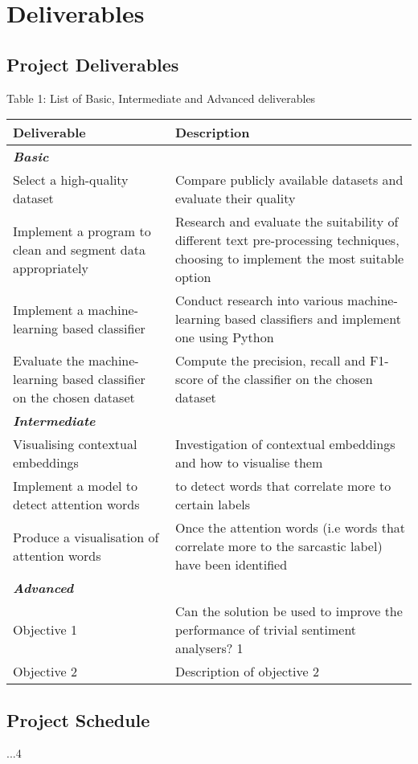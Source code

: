 \documentclass[12pt,a4paper]{article}
\begin{document}
\newpage

\section{Deliverables}
\subsection{Project Deliverables}
\begin{center}
	Table 1: List of Basic, Intermediate and Advanced deliverables
\end{center}
\begin{tabular}{p{5cm}p{10cm}}
	\hline
	\textbf{Deliverable} & \textbf{Description}\\
	\hline\hline
	\multicolumn{2}{l}{\textit{\textbf{Basic}}} \\
	\hline
	Select a high-quality dataset   &  Compare publicly available datasets and evaluate their quality\\
	\hline
	Implement a program to clean and segment data appropriately   & Research and evaluate the suitability of different text pre-processing techniques, choosing to implement the most suitable option\\
	\hline
	Implement a machine-learning based classifier & Conduct research into various machine-learning based classifiers and implement one using Python\\
	
	Evaluate the machine-learning based classifier on the chosen dataset & Compute the precision, recall and F1-score of the classifier on the chosen dataset\\
	\hline \hline
	\multicolumn{2}{l}{\textit{\textbf{Intermediate}}} \\
	\hline
	Visualising contextual embeddings   & Investigation of contextual embeddings and how to visualise them\\
	Implement a model to detect attention words &   to detect words that correlate more to certain labels  \\
	Produce a visualisation of attention words & Once the attention words (i.e words that correlate more to the sarcastic label) have been identified \\
	\hline \hline
	\multicolumn{2}{l}{\textit{\textbf{Advanced}}} \\
	\hline
	Objective 1   &  Can the solution be used to improve the performance of trivial sentiment analysers? 1\\
	Objective 2   &  Description of objective 2\\
	\hline
\end{tabular}

\subsection{Project Schedule}
...4 

\newpage
\end{document}
